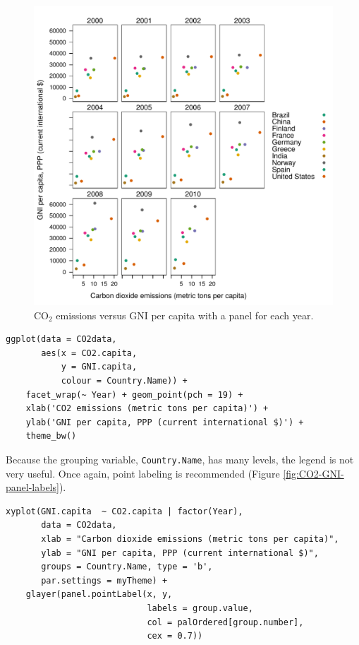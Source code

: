 \begin{figure}[htbp]
\centering
\includegraphics[width=.9\linewidth]{figs/CO2_capita_panel.pdf}
\caption{\(\mathrm{CO_2}\) emissions versus GNI per capita with a panel for each year. \label{fig:CO2-GNI-panel}}
\end{figure}

\lstset{language=r,label= ,caption= ,captionpos=b,numbers=none}
\begin{lstlisting}
ggplot(data = CO2data,
       aes(x = CO2.capita,
           y = GNI.capita,
           colour = Country.Name)) +
    facet_wrap(~ Year) + geom_point(pch = 19) + 
    xlab('CO2 emissions (metric tons per capita)') +
    ylab('GNI per capita, PPP (current international $)') +
    theme_bw()
\end{lstlisting}

Because the grouping variable, \texttt{Country.Name}, has many levels, the
legend is not very useful. Once again, point labeling is recommended
(Figure \ref{fig:CO2-GNI-panel-labels}).

\lstset{language=r,label= ,caption= ,captionpos=b,numbers=none}
\begin{lstlisting}
xyplot(GNI.capita  ~ CO2.capita | factor(Year),
       data = CO2data,
       xlab = "Carbon dioxide emissions (metric tons per capita)",
       ylab = "GNI per capita, PPP (current international $)",
       groups = Country.Name, type = 'b',
       par.settings = myTheme) + 
    glayer(panel.pointLabel(x, y,
                            labels = group.value,
                            col = palOrdered[group.number],
                            cex = 0.7))
\end{lstlisting}

